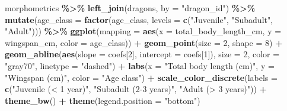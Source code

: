 \documentclass[
]{book}
\newenvironment{Shaded}{\begin{snugshade}}{\end{snugshade}}
\newcommand{\AttributeTok}[1]{\textcolor[rgb]{0.13,0.29,0.53}{#1}}
\newcommand{\DecValTok}[1]{\textcolor[rgb]{0.00,0.00,0.81}{#1}}
\newcommand{\FunctionTok}[1]{\textcolor[rgb]{0.13,0.29,0.53}{\textbf{#1}}}
\newcommand{\NormalTok}[1]{#1}
\newcommand{\SpecialCharTok}[1]{\textcolor[rgb]{0.81,0.36,0.00}{\textbf{#1}}}
\newcommand{\StringTok}[1]{\textcolor[rgb]{0.31,0.60,0.02}{#1}}
\begin{document}
\begin{Shaded}
\begin{Highlighting}[]
\NormalTok{morphometrics }\SpecialCharTok{\%\textgreater{}\%} 
  \FunctionTok{left\_join}\NormalTok{(dragons, }\AttributeTok{by =} \StringTok{"dragon\_id"}\NormalTok{) }\SpecialCharTok{\%\textgreater{}\%} 
  \FunctionTok{mutate}\NormalTok{(}\AttributeTok{age\_class =} \FunctionTok{factor}\NormalTok{(age\_class, }\AttributeTok{levels =} \FunctionTok{c}\NormalTok{(}\StringTok{"Juvenile"}\NormalTok{,}
                                                  \StringTok{"Subadult"}\NormalTok{,}
                                                  \StringTok{"Adult"}\NormalTok{))) }\SpecialCharTok{\%\textgreater{}\%} 
\FunctionTok{ggplot}\NormalTok{(}\AttributeTok{mapping =} \FunctionTok{aes}\NormalTok{(}\AttributeTok{x =}\NormalTok{ total\_body\_length\_cm, }\AttributeTok{y =}\NormalTok{ wingspan\_cm, }\AttributeTok{color =}\NormalTok{ age\_class)) }\SpecialCharTok{+}
  \FunctionTok{geom\_point}\NormalTok{(}\AttributeTok{size =} \DecValTok{2}\NormalTok{, }\AttributeTok{shape =} \DecValTok{8}\NormalTok{) }\SpecialCharTok{+}
  \FunctionTok{geom\_abline}\NormalTok{(}\FunctionTok{aes}\NormalTok{(}\AttributeTok{slope =}\NormalTok{ coefs[}\DecValTok{2}\NormalTok{], }\AttributeTok{intercept =}\NormalTok{ coefs[}\DecValTok{1}\NormalTok{]), }
              \AttributeTok{size =} \DecValTok{2}\NormalTok{,}
              \AttributeTok{color =} \StringTok{"gray70"}\NormalTok{,}
              \AttributeTok{linetype =} \StringTok{"dashed"}\NormalTok{) }\SpecialCharTok{+} 
  \FunctionTok{labs}\NormalTok{(}\AttributeTok{x =} \StringTok{"Total body length (cm)"}\NormalTok{, }\AttributeTok{y =} \StringTok{"Wingspan (cm)"}\NormalTok{, }\AttributeTok{color =} \StringTok{"Age class"}\NormalTok{) }\SpecialCharTok{+}
  \FunctionTok{scale\_color\_discrete}\NormalTok{(}\AttributeTok{labels =} \FunctionTok{c}\NormalTok{(}\StringTok{"Juvenile (\textless{} 1 year)"}\NormalTok{,}
                                 \StringTok{"Subadult (2{-}3 years)"}\NormalTok{,}
                                 \StringTok{"Adult (\textgreater{} 3 years)"}\NormalTok{)) }\SpecialCharTok{+}
  \FunctionTok{theme\_bw}\NormalTok{() }\SpecialCharTok{+}
  \FunctionTok{theme}\NormalTok{(}\AttributeTok{legend.position =} \StringTok{"bottom"}\NormalTok{) }
\end{Highlighting}
\end{Shaded}
\end{document}
